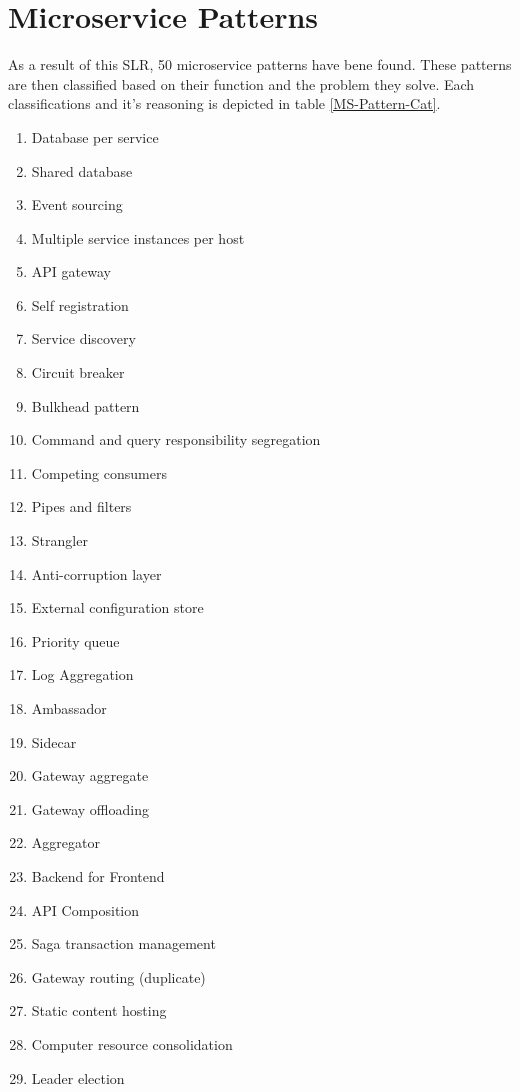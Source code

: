 \documentclass[conference]{IEEEtran}
\begin{document}
\section{Microservice Patterns}

As a result of this SLR, 50 microservice patterns have bene found. These patterns are then classified based on their function and the problem they solve. Each classifications and it's reasoning is depicted in table \ref{MS-Pattern-Cat}.


\begin{enumerate}
    \item Database per service \checkmark
    \item Shared database \checkmark
    \item Event sourcing \checkmark
    \item Multiple service instances per host \checkmark
    \item API gateway \checkmark
    \item Self registration \checkmark
    \item Service discovery \checkmark
    \item Circuit breaker \checkmark
    \item Bulkhead pattern \checkmark
    \item Command and query responsibility segregation \checkmark
    \item Competing consumers \checkmark
    \item Pipes and filters \checkmark
    \item Strangler \checkmark
    \item Anti-corruption layer \checkmark
    \item External configuration store  \checkmark
    \item Priority queue \checkmark
    \item Log Aggregation \checkmark
    \item Ambassador \checkmark
    \item Sidecar \checkmark
    \item Gateway aggregate \checkmark
    \item Gateway offloading \checkmark
    \item Aggregator \checkmark
    \item Backend for Frontend \checkmark
    \item API Composition \checkmark
    \item Saga transaction management \checkmark
    \item Gateway routing (duplicate) \checkmark
    \item Static content hosting \checkmark
    \item Computer resource consolidation \checkmark
    \item Leader election \checkmark
  \end{enumerate}
\end{document}
